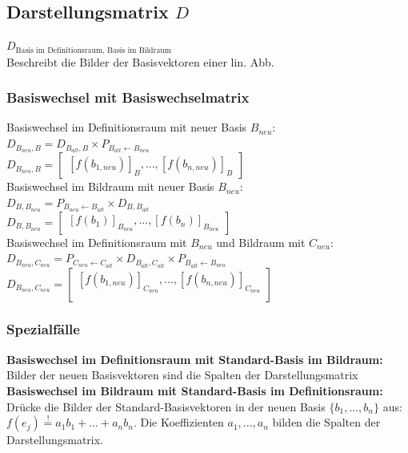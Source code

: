 \documentclass[german, fourcolumn, 8pt]{latex4ei/latex4ei_sheet}
\begin{document}
\begin{sectionbox}
    \subsection{Darstellungsmatrix $D$}
    $D_{\text{Basis im Definitionsraum, Basis im Bildraum}}$\\
    Beschreibt die Bilder der Basisvektoren einer lin. Abb.\\

    \subsubsection{Basiswechsel mit Basiswechselmatrix}
    Basiswechsel im Definitionsraum mit neuer Basis $B_{neu}$:\\
    $D_{B_{neu}, B}=D_{B_{alt},B} \times P_{B_{alt} \leftarrow B_{neu}}$\\
    $D_{B_{neu}, B}=\begin{bmatrix}
            [f(b_{1, neu})]_B, ..., [f(b_{n,neu})]_B
        \end{bmatrix}$\\

    Basiswechsel im Bildraum mit neuer Basis $B_{neu}$:\\
    $D_{B, B_{neu}}=P_{B_{neu} \leftarrow B_{alt}} \times D_{B, B_{alt}}$\\
    $D_{B, B_{neu}}=\begin{bmatrix}
            [f(b_1)]_{B_{neu}}, ..., [f(b_n)]_{B_{neu}}
        \end{bmatrix}$\\

    Basiswechsel im Definitionsraum mit $B_{neu}$ und Bildraum mit $C_{neu}$:\\
    $D_{B_{neu}, C_{neu}}=P_{C_{neu} \leftarrow C_{alt}} \times D_{B_{alt},C_{alt}} \times P_{B_{alt} \leftarrow B_{neu}}$\\
    $D_{B_{neu}, C_{neu}}=\begin{bmatrix}
            [f(b_{1, neu})]_{C_{neu}},...,[f(b_{n, neu})]_{C_{neu}} \\
        \end{bmatrix}$\\

    \subsubsection{Spezialfälle}
    \textbf{Basiswechsel im Definitionsraum mit Standard-Basis im Bildraum:}\\
    Bilder der neuen Basisvektoren sind die Spalten der Darstellungsmatrix\\

    \textbf{Basiswechsel im Bildraum mit Standard-Basis im Definitionsraum:}\\
    Drücke die Bilder der Standard-Basisvektoren in der neuen Basis $\{b_1, ..., b_n\}$ aus:
    $f(e_j)\overset{!}{=}a_1b_1 + ... + a_nb_n$.
    Die Koeffizienten $a_1,...,a_n$ bilden die Spalten der Darstellungsmatrix.
\end{sectionbox}
\end{document}
